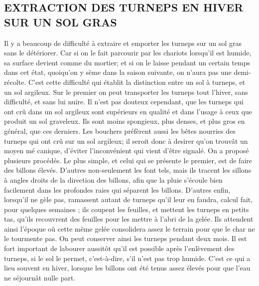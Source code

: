 \subsection{EXTRACTION DES TURNEPS EN HIVER SUR UN SOL GRAS}
Il y a beaucoup de difficulté à extraire et emporter les turneps sur un sol gras sans le détériorer. Car si on le fait parcourir par les chariots lorsqu’il est humide, sa surface devient comme du mortier; et si on le laisse pendant un certain temps dans cet état, quoiqu’on y sème dans la saison suivante, on n’aura pas une demi-récolte. C’est cette difficulté qui établit la distinction entre un sol à turneps, et un sol argileux. Sur le premier on peut transporter les turneps tout l’hiver, sans difficulté, et sans lui nuire.
Il n’est pas douteux cependant, que les turneps qui ont crû dans un sol argileux sont supérieurs en qualité et dans l’usage à ceux que produit un sol graveleux. Ils sont moins spongieux, plus denses, et plus gros en général, que ces derniers. Les bouchers préfèrent aussi les bêtes nourries des turneps qui ont crû sur un sol argileux; il seroit donc à desirer qu’on trouvât un moyen mé\setcounter{page}{121} canique, d'éviter l'inconvénient qui vient d'être signalé. On a proposé plusieurs procédés. Le plus simple, et celui qui se présente le premier, est de faire des billons élevés. D'autres non-seulement les font tels, mais ils tracent les sillons à angles droits de la direction des billons, afin que la pluie s'écoule bien facilement dans les profondes raies qui séparent les billons. D'autres enfin, lorsqu'il ne gèle pas, ramassent autant de turneps qu'il leur en faudra, calcul fait, pour quelques semaines ; ils coupent les feuilles, et mettent les turneps en petits tas, qu'ils recouvrent des feuilles pour les mettre à l'abri de la gelée. Ils attendent ainsi l'époque où cette même gelée consolidera assez le terrain pour que le char ne le tourmente pas. On peut conserver ainsi les turneps pendant deux mois. Il est fort important de labourer aussitôt qu'il est possible après l'enlèvement des turneps, si le sol le permet, c'est-à-dire, s'il n'est pas trop humide. C'est ce qui a lieu souvent en hiver, lorsque les billons ont été tenus assez élevés pour que l'eau ne séjournât nulle part.